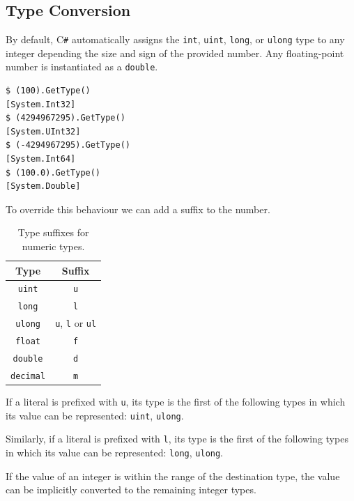 \documentclass{article}
\begin{document}
\subsection{Type Conversion}
By default, C\texttt{\#} automatically assigns the \lstinline!int!, \lstinline!uint!,
\lstinline!long!, or \lstinline!ulong! type to any integer depending the size and sign
of the provided number. Any floating-point number is instantiated as a \lstinline!double!.
\begin{lstlisting}
$ (100).GetType()
[System.Int32]
$ (4294967295).GetType()    
[System.UInt32]
$ (-4294967295).GetType()
[System.Int64]
$ (100.0).GetType()
[System.Double]
\end{lstlisting}
To override this behaviour we can add a suffix to the number.
\begin{table}[H]
    \centering
    \begin{tabular}{c c}
        \toprule
        \textbf{Type}       & \textbf{Suffix}                                \\
        \midrule
        \lstinline!uint!    & \lstinline!u!                                  \\
        \lstinline!long!    & \lstinline!l!                                  \\
        \lstinline!ulong!   & \lstinline!u!, \lstinline!l! or \lstinline!ul! \\
        \midrule
        \lstinline!float!   & \lstinline!f!                                  \\
        \lstinline!double!  & \lstinline!d!                                  \\
        \lstinline!decimal! & \lstinline!m!                                  \\
        \bottomrule
    \end{tabular}
    \caption{Type suffixes for numeric types.}
\end{table}
If a literal is prefixed with \lstinline!u!, its type is the first
of the following types in which its value can be represented:
\lstinline!uint!, \lstinline!ulong!.

Similarly, if a literal is prefixed with \lstinline!l!, its type is the first
of the following types in which its value can be represented:
\lstinline!long!, \lstinline!ulong!.

If the value of an integer is within the range of the destination type, 
the value can be implicitly converted to the remaining integer types.
\end{document}
